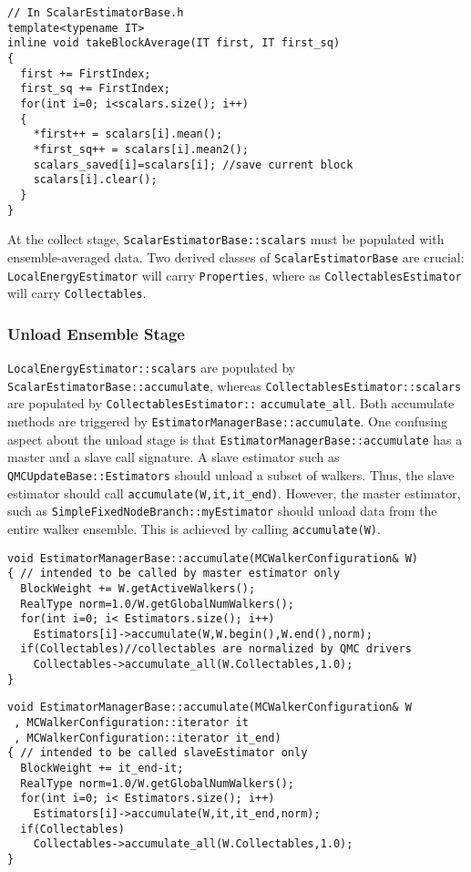 \begin{lstlisting}
// In ScalarEstimatorBase.h
template<typename IT>
inline void takeBlockAverage(IT first, IT first_sq)
{
  first += FirstIndex;
  first_sq += FirstIndex;
  for(int i=0; i<scalars.size(); i++)
  {
    *first++ = scalars[i].mean();
    *first_sq++ = scalars[i].mean2();
    scalars_saved[i]=scalars[i]; //save current block
    scalars[i].clear();
  }
}
\end{lstlisting}

At the collect stage, \verb|ScalarEstimatorBase::scalars| must be populated with ensemble-averaged data. Two derived classes of \verb|ScalarEstimatorBase| are crucial: \verb|LocalEnergyEstimator| will carry \verb|Properties|, where as \verb|CollectablesEstimator| will carry \verb|Collectables|.

\subsubsection{Unload Ensemble Stage}
\verb|LocalEnergyEstimator::scalars| are populated by \verb|ScalarEstimatorBase::accumulate|, whereas \verb|CollectablesEstimator::scalars| are populated by \verb|CollectablesEstimator::|
\verb|accumulate_all|. Both accumulate methods are triggered by \verb|EstimatorManagerBase::accumulate|. One confusing aspect about the unload stage is that \verb|EstimatorManagerBase::accumulate| has a master and a slave call signature. A slave estimator such as \verb|QMCUpdateBase::Estimators| should unload a subset of walkers. Thus, the slave estimator should call \verb|accumulate(W,it,it_end)|. However, the master estimator, such as \verb|SimpleFixedNodeBranch::myEstimator| should unload data from the entire walker ensemble. This is achieved by calling \verb|accumulate(W)|.

\begin{lstlisting}
void EstimatorManagerBase::accumulate(MCWalkerConfiguration& W)
{ // intended to be called by master estimator only
  BlockWeight += W.getActiveWalkers();
  RealType norm=1.0/W.getGlobalNumWalkers();
  for(int i=0; i< Estimators.size(); i++)
    Estimators[i]->accumulate(W,W.begin(),W.end(),norm);
  if(Collectables)//collectables are normalized by QMC drivers
    Collectables->accumulate_all(W.Collectables,1.0);
}
\end{lstlisting}

\begin{lstlisting}
void EstimatorManagerBase::accumulate(MCWalkerConfiguration& W
 , MCWalkerConfiguration::iterator it
 , MCWalkerConfiguration::iterator it_end)
{ // intended to be called slaveEstimator only
  BlockWeight += it_end-it;
  RealType norm=1.0/W.getGlobalNumWalkers();
  for(int i=0; i< Estimators.size(); i++)
    Estimators[i]->accumulate(W,it,it_end,norm);
  if(Collectables)
    Collectables->accumulate_all(W.Collectables,1.0);
}
\end{lstlisting}

